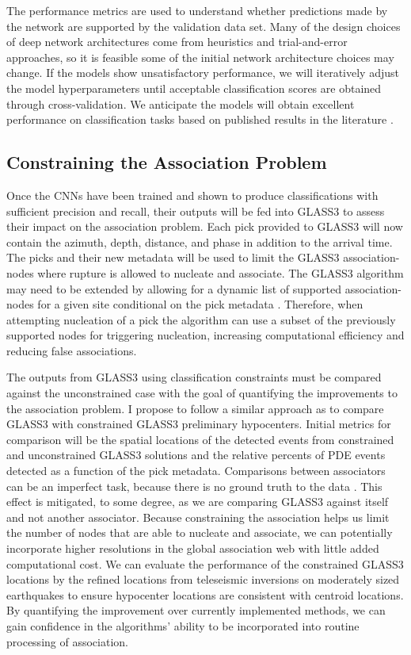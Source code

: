\documentclass[12p]{article}
\begin{document}
The performance metrics are used to understand whether predictions made by the network are supported by the validation
data set. Many of the design choices of deep network architectures come from heuristics and trial-and-error approaches,
so it is feasible some of the initial network architecture choices may change. If the models show unsatisfactory
performance, we will iteratively adjust the model hyperparameters until acceptable classification scores are obtained
through cross-validation. We anticipate the models will obtain excellent performance on classification tasks based on
published results in the literature \citep{Perol2018, Ross2018a, Ross2018b, Zhu2019a, Zhu2019b}.

\subsection{Constraining the Association Problem}

Once the CNNs have been trained and shown to produce classifications with sufficient precision and recall, their outputs
will be fed into GLASS3 to assess their impact on the association problem. Each pick provided to GLASS3 will now contain
the azimuth, depth, distance, and phase in addition to the arrival time. The picks and their new metadata will be used
to limit the GLASS3 association-nodes where rupture is allowed to nucleate and associate. The GLASS3 algorithm may need
to be extended by allowing for a dynamic list of supported association-nodes for a given site conditional on the pick
metadata \citep{Yeck2019}. Therefore, when attempting nucleation of a pick the algorithm can use a subset of the
previously supported nodes for triggering nucleation, increasing computational efficiency and reducing false
associations.

The outputs from GLASS3 using classification constraints must be compared against the unconstrained case with the goal
of quantifying the improvements to the association problem. I propose to follow a similar approach as \citet{Yeck2019}
to compare GLASS3 with constrained GLASS3 preliminary hypocenters. Initial metrics for comparison will be the spatial
locations of the detected events from constrained and unconstrained GLASS3 solutions and the relative percents of PDE
events detected as a function of the pick metadata. Comparisons between associators can be an imperfect task, because
there is no ground truth to the data \citep{Yeck2019}. This effect is mitigated, to some degree, as we are comparing
GLASS3 against itself and not another associator. Because constraining the association helps us limit the number of
nodes that are able to nucleate and associate, we can potentially incorporate higher resolutions in the global
association web with little added computational cost. We can evaluate the performance of the constrained GLASS3
locations by the refined locations from teleseismic inversions \citep{Hayes2009, Ekstrom2012} on moderately sized
earthquakes to ensure hypocenter locations are consistent with centroid locations. By quantifying the improvement over currently implemented methods, we can gain confidence in the algorithms' ability to be incorporated into routine processing of association.
\end{document}
